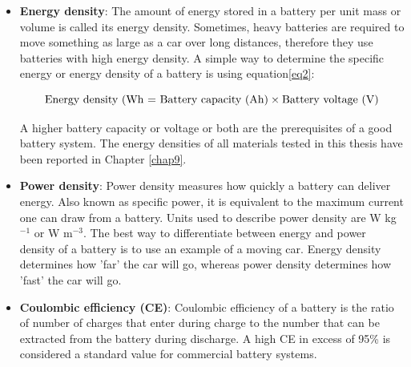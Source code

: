 \begin{itemize}
\item \textbf{Energy density}: The amount of energy stored in a battery per unit mass or volume is called its energy density. Sometimes, heavy batteries are required to move something as large as a car over long distances, therefore they use batteries with high energy density. A simple way to determine the specific energy or energy density of a battery is using equation\ref{eq2}:

\begin{equation} \label{eq2}
    \text{Energy density (Wh = } \text{Battery capacity (Ah)} \times \text{Battery voltage (V)}\\
\end{equation}

A higher battery capacity or voltage or both are the prerequisites of a good battery system. The energy densities of all materials tested in this thesis have been reported in Chapter \ref{chap9}.\\

\item \textbf{Power density}: Power density measures how quickly a battery can deliver energy. Also known as specific power, it is equivalent to the maximum current one can draw from a battery. Units used to describe power density are W kg$^{-1}$ or W m$^{-3}$. The best way to differentiate between energy and power density of a battery is to use an example of a moving car. Energy density determines how 'far' the car will go, whereas power density determines how 'fast' the car will go.

\item \textbf{Coulombic efficiency (CE)}: Coulombic efficiency of a battery is the ratio of number of charges that enter during charge to the number that can be extracted from the battery during discharge. A high CE in excess of 95\% is considered a standard value for commercial battery systems. 
\end{itemize}

